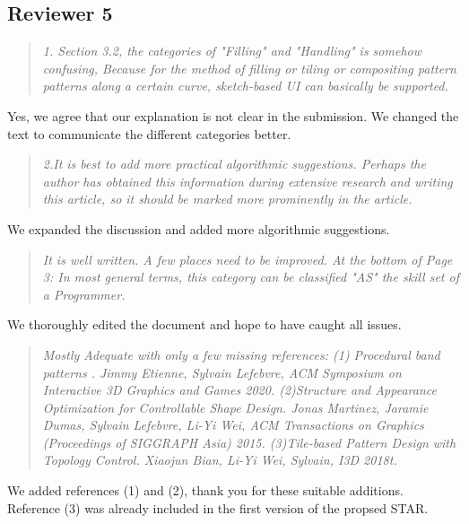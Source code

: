 \documentclass{egpubl}
\newcommand{\rev}[2]{{\color{greenrev}\textsuperscript{#1}#2}}
\renewcommand{\rev}[2]{{#2}}
\begin{document}
\subsection*{Reviewer 5} 

\begin{quote}
\emph{1. Section 3.2, the categories of "Filling" and "Handling" is somehow confusing, Because for the method of filling or tiling or compositing pattern patterns along a certain curve, sketch-based UI can basically be supported.}
\end{quote}

\rev{Comment}{Yes, we agree that our explanation is not clear in the submission. We changed the text to communicate the different categories better.}

\begin{quote}
\emph{2.It is best to add more practical algorithmic suggestions. Perhaps the author has obtained this information during extensive research and writing this article, so it should be marked more prominently in the article.}
\end{quote}

\rev{}{We expanded the discussion and added more algorithmic suggestions.}

\begin{quote}
\emph{It is well written.  A few places need to be improved.
At the bottom of Page 3:  In most general terms, this category can be classified  "AS" the skill set of a Programmer.}
\end{quote}

\rev{}{We thoroughly edited the document and hope to have caught all issues.}


\begin{quote}
\emph{Mostly Adequate with only a few missing references: (1) Procedural band patterns . Jimmy Etienne, Sylvain Lefebvre, ACM Symposium on Interactive 3D Graphics and Games 2020. (2)Structure and Appearance Optimization for Controllable Shape Design. Jonas Martinez, Jaramie Dumas, Sylvain Lefebvre, Li-Yi Wei, ACM Transactions on Graphics (Proceedings of SIGGRAPH Asia) 2015. (3)Tile-based Pattern Design with Topology Control. Xiaojun Bian, Li-Yi Wei, Sylvain, I3D 2018t.}
\end{quote}


\rev{}{
    We added references (1) and (2), thank you for these suitable additions. Reference (3) was already included in the first version of the propsed STAR.
}





%  
%        




\end{document}
